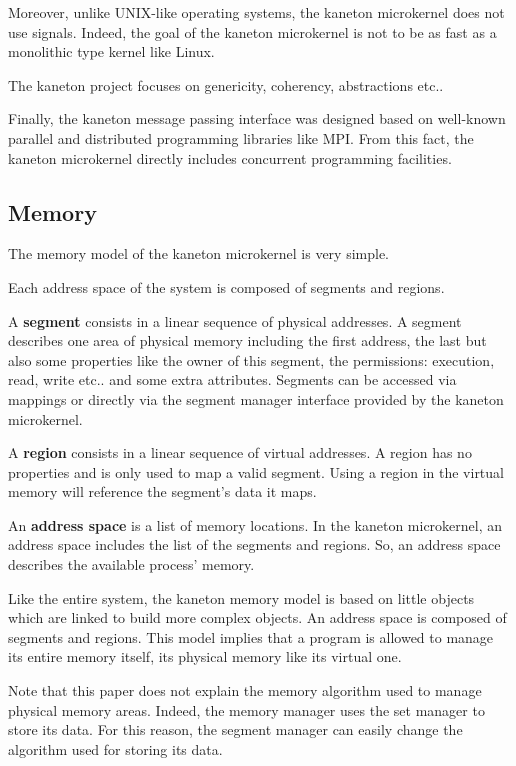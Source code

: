 \begin{multicols}{2}
Moreover, unlike UNIX-like operating systems, the kaneton microkernel does
not use signals. Indeed, the goal of the kaneton microkernel is not to
be as fast as a monolithic type kernel like Linux.

The kaneton project focuses on genericity, coherency, abstractions etc..

Finally, the kaneton message passing interface was designed based on
well-known parallel and distributed programming libraries like MPI. From
this fact, the kaneton microkernel directly includes concurrent
programming facilities.

%
%

\subsection{Memory}

The memory model of the kaneton microkernel is very simple.

Each address space of the system is composed of segments and regions.

A \textbf{segment} consists in a linear sequence of physical addresses.
A segment describes one area of physical memory including the
first address, the last but also some properties like the owner of this
segment, the permissions: execution, read, write etc.. and some
extra attributes. Segments can be accessed via mappings or directly via
the segment manager interface provided by the kaneton microkernel.

A \textbf{region} consists in a linear sequence of virtual addresses.
A region has no properties and is only used to map a valid segment.
Using a region in the virtual memory will reference the segment's data
it maps.

An \textbf{address space} is a list of memory locations. In the kaneton
microkernel, an address space includes the list of the segments and regions.
So, an address space describes the available process' memory.

Like the entire system, the kaneton memory model is based on little objects
which are linked to build more complex objects. An address space is composed
of segments and regions. This model implies that a program is allowed to
manage its entire memory itself, its physical memory like its virtual one.

Note that this paper does not explain the memory algorithm used to manage
physical memory areas. Indeed, the memory manager uses the set manager
to store its data. For this reason, the segment manager can easily change
the algorithm used for storing its data.


\end{multicols}
